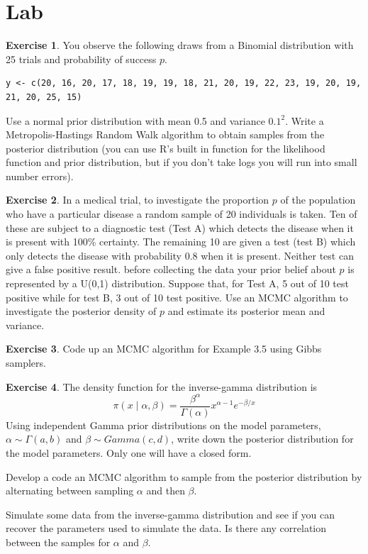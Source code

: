 \documentclass[
]{book}
\theoremstyle{definition}
\theoremstyle{definition}
\theoremstyle{definition}
\newtheorem{exercise}{Exercise}[chapter]
\theoremstyle{definition}
\theoremstyle{remark}
\begin{document}
\hypertarget{lab-2}{%
\section{Lab}\label{lab-2}}

\begin{exercise}
You observe the following draws from a Binomial distribution with 25 trials and probability of success \(p\).

\begin{verbatim}
y <- c(20, 16, 20, 17, 18, 19, 19, 18, 21, 20, 19, 22, 23, 19, 20, 19, 21, 20, 25, 15)
\end{verbatim}

Use a normal prior distribution with mean 0.5 and variance \(0.1^2\). Write a Metropolis-Hastings Random Walk algorithm to obtain samples from the posterior distribution (you can use R's built in function for the likelihood function and prior distribution, but if you don't take logs you will run into small number errors).
\end{exercise}

\begin{exercise}
In a medical trial, to investigate the proportion \(p\) of the population who have a particular disease a random sample of 20 individuals is taken. Ten of these are subject to a diagnostic test (Test A) which detects the disease when it is present with 100\% certainty. The remaining 10 are given a test (test B) which only detects the disease with probability 0.8 when it is present. Neither test can give a false positive result. before collecting the data your prior belief about \(p\) is represented by a U(0,1) distribution. Suppose that, for Test A, 5 out of 10 test positive while for test B, 3 out of 10 test positive. Use an MCMC algorithm to investigate the posterior density of \(p\) and estimate its posterior mean and variance.
\end{exercise}

\begin{exercise}
Code up an MCMC algorithm for Example 3.5 using Gibbs samplers.
\end{exercise}

\begin{exercise}
The density function for the inverse-gamma distribution is
\[
\pi(x\mid \alpha, \beta) = \frac{\beta^\alpha}{\Gamma(\alpha)}x^{\alpha - 1}e^{-\beta/x}
\]
Using independent Gamma prior distributions on the model parameters, \(\alpha \sim \Gamma(a, b)\) and \(\beta \sim Gamma(c, d)\), write down the posterior distribution for the model parameters. Only one will have a closed form.

Develop a code an MCMC algorithm to sample from the posterior distribution by alternating between sampling \(\alpha\) and then \(\beta\).

Simulate some data from the inverse-gamma distribution and see if you can recover the parameters used to simulate the data. Is there any correlation between the samples for \(\alpha\) and \(\beta\).
\end{exercise}
\end{document}
